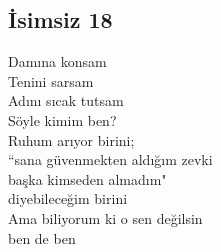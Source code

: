 \subsection{İsimsiz 18}

Damına konsam \\
Tenini sarsam \\
Adını sıcak tutsam \\
Söyle kimim ben? \\

\noindent\newline
Ruhum arıyor birini; \\
“sana güvenmekten aldığım zevki \\
başka kimseden almadım" \\
diyebileceğim birini \\

\noindent\newline
Ama biliyorum ki o sen değilsin \\
ben de ben \\